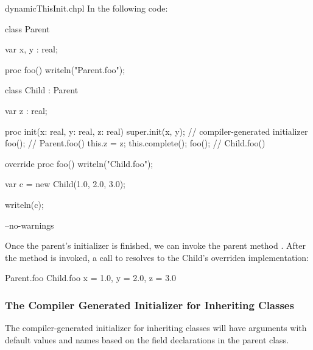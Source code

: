 \begin{chapelexample}{dynamicThisInit.chpl}
In the following code:
\begin{chapel}
class Parent {
  var x, y : real;

  proc foo() {
    writeln("Parent.foo");
  }
}

class Child : Parent {
  var z : real;

  proc init(x: real, y: real, z: real) {
    super.init(x, y); // compiler-generated initializer
    foo(); // Parent.foo()
    this.z = z;
    this.complete();
    foo(); // Child.foo()
  }

  override proc foo() {
    writeln("Child.foo");
  }
}

var c = new Child(1.0, 2.0, 3.0);
\end{chapel}
\begin{chapelpost}
writeln(c);
\end{chapelpost}
\begin{chapelcompopts}
--no-warnings
\end{chapelcompopts}
Once the parent's initializer is finished, we can invoke the parent method
. After the  method is invoked, a call to 
resolves to the Child's overriden implementation:
\begin{chapelprintoutput}{}
Parent.foo
Child.foo
{x = 1.0, y = 2.0, z = 3.0}
\end{chapelprintoutput}
\end{chapelexample}

\subsubsection{The Compiler Generated Initializer for Inheriting Classes}
\label{The_Compiler_Generated_Initializer_for_Inheriting_Classes}

The compiler-generated initializer for inheriting classes will have arguments
with default values and names based on the field declarations in the parent
class.

